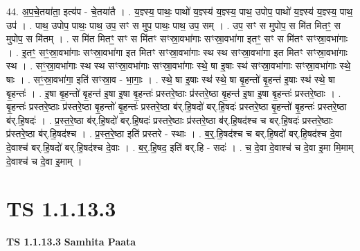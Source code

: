 \documentclass[17pt]{extarticle}
\begin{document}
44. अ॒प॒चे॒तया॑ता॒ इत्य॑प - चे॒तया॑तै । . य॒ज्ञ्स्य॒ पाथः॒ पाथो॑ य॒ज्ञ्स्य॑ य॒ज्ञ्स्य॒ पाथ॒ उपोप॒ पाथो॑ य॒ज्ञ्स्य॑ य॒ज्ञ्स्य॒ पाथ॒ उप॑ । . पाथ॒ उपोप॒ पाथः॒ पाथ॒ उप॒ सꣳ स मुप॒ पाथः॒ पाथ॒ उप॒ सम् । . उप॒ सꣳ स मुपोप॒ स मि॑त मितꣳ॒॒ स मुपोप॒ स मि॑तम् । . स मि॑त मितꣳ॒॒ सꣳ स मि॑तꣳ सꣳस्रा॒वभा॑गाः सꣳस्रा॒वभा॑गा इतꣳ॒॒ सꣳ स मि॑तꣳ सꣳस्रा॒वभा॑गाः । . इ॒तꣳ॒॒ सꣳ॒॒स्रा॒वभा॑गाः सꣳस्रा॒वभा॑गा इत मितꣳ सꣳस्रा॒वभा॑गाः स्थ स्थ सꣳस्रा॒वभा॑गा इत मितꣳ सꣳस्रा॒वभा॑गाः स्थ । . सꣳ॒॒स्रा॒वभा॑गाः स्थ स्थ सꣳस्रा॒वभा॑गाः सꣳस्रा॒वभा॑गाः स्थे॒ षा इ॒षाः स्थ॑ सꣳस्रा॒वभा॑गाः सꣳस्रा॒वभा॑गाः स्थे॒ षाः । . सꣳ॒॒स्रा॒वभा॑गा॒ इति॑ सꣳस्रा॒व - भा॒गाः॒ । . स्थे॒ षा इ॒षाः स्थ॑ स्थे॒ षा बृ॒हन्तो॑ बृ॒हन्त॑ इ॒षाः स्थ॑ स्थे॒ षा बृ॒हन्तः॑ । . इ॒षा बृ॒हन्तो॑ बृ॒हन्त॑ इ॒षा इ॒षा बृ॒हन्तः॑ प्रस्तरे॒ष्ठाः प्र॑स्तरे॒ष्ठा बृ॒हन्त॑ इ॒षा इ॒षा बृ॒हन्तः॑ प्रस्तरे॒ष्ठाः । . बृ॒हन्तः॑ प्रस्तरे॒ष्ठाः प्र॑स्तरे॒ष्ठा बृ॒हन्तो॑ बृ॒हन्तः॑ प्रस्तरे॒ष्ठा ब॑र्.हि॒षदो॑ बर्.हि॒षदः॑ प्रस्तरे॒ष्ठा बृ॒हन्तो॑ बृ॒हन्तः॑ प्रस्तरे॒ष्ठा ब॑र्.हि॒षदः॑ । . प्र॒स्त॒रे॒ष्ठा ब॑र्.हि॒षदो॑ बर्.हि॒षदः॑ प्रस्तरे॒ष्ठाः प्र॑स्तरे॒ष्ठा ब॑र्.हि॒षद॑श्च च बर्.हि॒षदः॑ प्रस्तरे॒ष्ठाः प्र॑स्तरे॒ष्ठा ब॑र्.हि॒षद॑श्च । . प्र॒स्त॒रे॒ष्ठा इति॑ प्रस्तरे - स्थाः । . ब॒र्॒.हि॒षद॑श्च च बर्.हि॒षदो॑ बर्.हि॒षद॑श्च दे॒वा दे॒वाश्च॑ बर्.हि॒षदो॑ बर्.हि॒षद॑श्च दे॒वाः । . ब॒र्॒.हि॒षद॒ इति॑ बर्.हि - सदः॑ । . च॒ दे॒वा दे॒वाश्च॑ च दे॒वा इ॒मा मि॒माम् दे॒वाश्च॑ च दे॒वा इ॒माम् । \newline
\pagebreak
{}

\section{ TS 1.1.13.3 }

\textbf{TS 1.1.13.3 } \newline
\textbf{Samhita Paata} \newline
\end{document}
